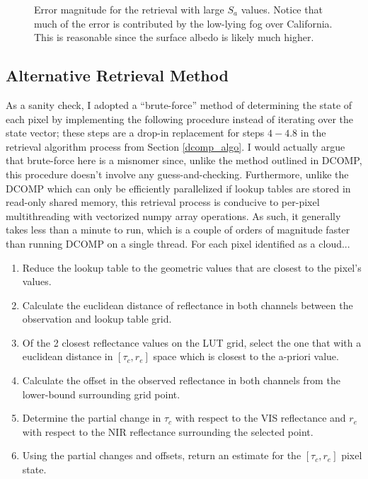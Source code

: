 \documentclass[12pt]{article}
\begin{document}
\begin{figure}[h!]
\begin{center}
{        }
    \end{center}
    \caption{Error magnitude for the retrieval with large $S_a$ values. Notice that much of the error is contributed by the low-lying fog over California. This is reasonable since the surface albedo is likely much higher.}
    \label{big_sa_err}
\end{figure}

\vspace{-2em}

\subsection{Alternative Retrieval Method}

As a sanity check, I adopted a ``brute-force'' method of determining the state of each pixel by implementing the following procedure instead of iterating over the state vector; these steps are a drop-in replacement for steps $4-4.8$ in the retrieval algorithm process from Section \ref{dcomp_algo}. I would actually argue that brute-force here is a misnomer since, unlike the method outlined in DCOMP, this procedure doesn't involve any guess-and-checking. Furthermore, unlike the DCOMP which can only be efficiently parallelized if lookup tables are stored in read-only shared memory, this retrieval process is conducive to per-pixel multithreading with vectorized numpy array operations. As such, it generally takes less than a minute to run, which is a couple of orders of magnitude faster than running DCOMP on a single thread.  For each pixel identified as a cloud...

\begin{enumerate}
    \setlength\itemsep{-.2em}
    \item Reduce the lookup table to the geometric values that are closest to the pixel's values.
    \item Calculate the euclidean distance of reflectance in both channels between the observation and lookup table grid.
    \item Of the 2 closest reflectance values on the LUT grid, select the one that with a euclidean distance in $[\tau_c, r_e]$ space which is closest to the a-priori value.
    \item Calculate the offset in the observed reflectance in both channels from the lower-bound surrounding grid point.
    \item Determine the partial change in $\tau_c$ with respect to the VIS reflectance and $r_e$ with respect to the NIR reflectance surrounding the selected point.
    \item Using the partial changes and offsets, return an estimate for the $[\tau_c, r_e]$ pixel state.
\end{enumerate}
\end{document}
